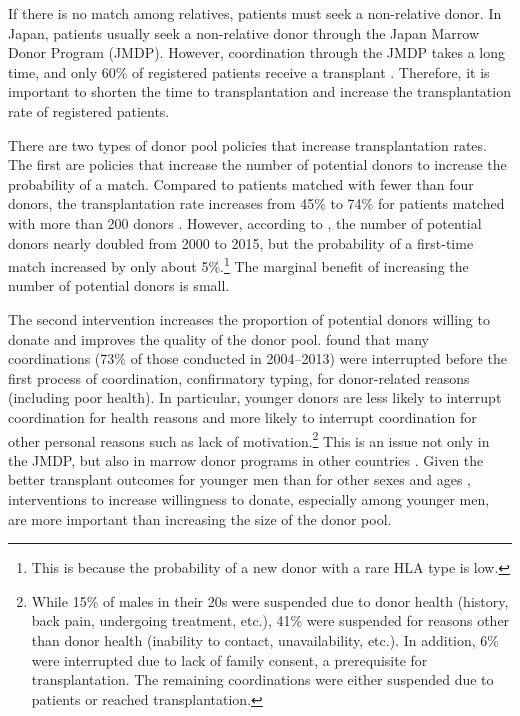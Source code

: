 \documentclass[
]{article}
\begin{document}
If there is no match among relatives, patients must seek a non-relative donor. In Japan, patients usually seek a non-relative donor through the Japan Marrow Donor Program (JMDP). However, coordination through the JMDP takes a long time, and only 60\% of registered patients receive a transplant \citep{Hirakawa2018}. Therefore, it is important to shorten the time to transplantation and increase the transplantation rate of registered patients.

There are two types of donor pool policies that increase transplantation rates. The first are policies that increase the number of potential donors to increase the probability of a match. Compared to patients matched with fewer than four donors, the transplantation rate increases from 45\% to 74\% for patients matched with more than 200 donors \citep{Hirakawa2018}. However, according to \citet{Takanashi2016}, the number of potential donors nearly doubled from 2000 to 2015, but the probability of a first-time match increased by only about 5\%.\footnote{This is because the probability of a new donor with a rare HLA type is low.} The marginal benefit of increasing the number of potential donors is small.

The second intervention increases the proportion of potential donors willing to donate and improves the quality of the donor pool. \citet{Hirakawa2018} found that many coordinations (73\% of those conducted in 2004--2013) were interrupted before the first process of coordination, confirmatory typing, for donor-related reasons (including poor health). In particular, younger donors are less likely to interrupt coordination for health reasons and more likely to interrupt coordination for other personal reasons such as lack of motivation.\footnote{While 15\% of males in their 20s were suspended due to donor health (history, back pain, undergoing treatment, etc.), 41\% were suspended for reasons other than donor health (inability to contact, unavailability, etc.). In addition, 6\% were interrupted due to lack of family consent, a prerequisite for transplantation. The remaining coordinations were either suspended due to patients or reached transplantation.} This is an issue not only in the JMDP, but also in marrow donor programs in other countries \citep{Haylock2022}. Given the better transplant outcomes for younger men than for other sexes and ages \citep[e.g.,][]{Kollman2016}, interventions to increase willingness to donate, especially among younger men, are more important than increasing the size of the donor pool.
\end{document}
